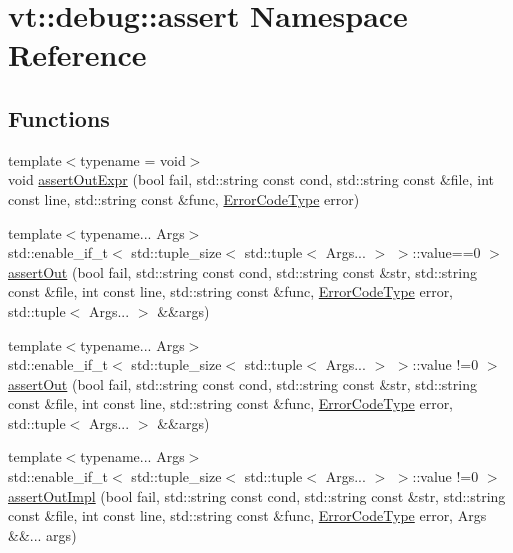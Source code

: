 \hypertarget{namespacevt_1_1debug_1_1assert}{}\section{vt\+:\+:debug\+:\+:assert Namespace Reference}
\label{namespacevt_1_1debug_1_1assert}
\subsection*{Functions}
\begin{DoxyCompactItemize}
\item 
{\footnotesize template$<$typename  = void$>$ }\\void \hyperlink{namespacevt_1_1debug_1_1assert_ad28250da4c859ea57caf834fcb3e125f}{assert\+Out\+Expr} (bool fail, std\+::string const cond, std\+::string const \&file, int const line, std\+::string const \&func, \hyperlink{namespacevt_a793764d753923abc3d32929870beb485}{Error\+Code\+Type} error)
\item 
{\footnotesize template$<$typename... Args$>$ }\\std\+::enable\+\_\+if\+\_\+t$<$ std\+::tuple\+\_\+size$<$ std\+::tuple$<$ Args... $>$ $>$\+::value==0 $>$ \hyperlink{namespacevt_1_1debug_1_1assert_abb19d5cbedec26872e97631a935f8716}{assert\+Out} (bool fail, std\+::string const cond, std\+::string const \&str, std\+::string const \&file, int const line, std\+::string const \&func, \hyperlink{namespacevt_a793764d753923abc3d32929870beb485}{Error\+Code\+Type} error, std\+::tuple$<$ Args... $>$ \&\&args)
\item 
{\footnotesize template$<$typename... Args$>$ }\\std\+::enable\+\_\+if\+\_\+t$<$ std\+::tuple\+\_\+size$<$ std\+::tuple$<$ Args... $>$ $>$\+::value !=0 $>$ \hyperlink{namespacevt_1_1debug_1_1assert_a4bc7c613ca106f6d3d7867389c4380d0}{assert\+Out} (bool fail, std\+::string const cond, std\+::string const \&str, std\+::string const \&file, int const line, std\+::string const \&func, \hyperlink{namespacevt_a793764d753923abc3d32929870beb485}{Error\+Code\+Type} error, std\+::tuple$<$ Args... $>$ \&\&args)
\item 
{\footnotesize template$<$typename... Args$>$ }\\std\+::enable\+\_\+if\+\_\+t$<$ std\+::tuple\+\_\+size$<$ std\+::tuple$<$ Args... $>$ $>$\+::value !=0 $>$ \hyperlink{namespacevt_1_1debug_1_1assert_adcb1f71720f5961b3a6430416e95eb6b}{assert\+Out\+Impl} (bool fail, std\+::string const cond, std\+::string const \&str, std\+::string const \&file, int const line, std\+::string const \&func, \hyperlink{namespacevt_a793764d753923abc3d32929870beb485}{Error\+Code\+Type} error, Args \&\&... args)

\end{DoxyCompactItemize}

